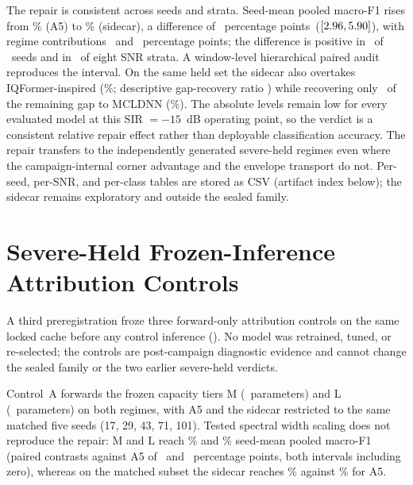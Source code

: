 \documentclass[letterpaper,onecolumn,11pt,journal]{IEEEtran}
\newcommand{\pp}{percentage points}
\begin{document}
The repair is consistent across seeds and strata. Seed-mean pooled macro-F1
rises from \SevereRepairLevelAFive\%
(A5) to \SevereRepairLevelSidecar\% (sidecar), a difference of
\SevereRepairDiff\ \pp\ ($[2.96,5.90]$), with
regime contributions \SevereRepairRegimeOneDiff\ and
\SevereRepairRegimeTwoDiff\ \pp; the difference is positive in
\SevereRepairPositiveSeeds\ of \ProtocolSeedCount\ seeds and in
\SevereRepairPositiveSnrStrata\ of eight SNR strata. A window-level
hierarchical paired audit reproduces the interval. On the same held set the
sidecar also overtakes IQFormer-inspired (\SevereRepairLevelIqformer\%;
descriptive gap-recovery ratio \SevereRepairGapRecoveryIqformer) while
recovering only \SevereRepairGapRecoveryMcldnn\ of the remaining gap to
MCLDNN (\SevereRepairLevelMcldnn\%). The absolute levels remain low for every
evaluated model at this SIR $=-15$~dB operating point, so the verdict is a
consistent relative repair effect rather than deployable classification
accuracy. The repair transfers to the independently generated severe-held
regimes even where the campaign-internal corner advantage and the envelope
transport do not. Per-seed, per-SNR, and per-class tables are stored as CSV
(artifact index below); the sidecar remains exploratory and outside the
sealed family.

\section{Severe-Held Frozen-Inference Attribution Controls}
\label{sec:controls}
A third preregistration froze three forward-only attribution controls on the
same locked cache before any control inference
(). No model was
retrained, tuned, or re-selected; the controls are post-campaign diagnostic
evidence and cannot change the sealed family or the two earlier severe-held
verdicts.

Control~A forwards the frozen capacity tiers M (\CapacityMParameters\
parameters) and L (\CapacityLParameters\ parameters) on both regimes, with
A5 and the sidecar restricted to the same matched five seeds
(17, 29, 43, 71, 101). Tested spectral width scaling does not reproduce the
repair: M and L reach \SevereControlLevelCapM\% and \SevereControlLevelCapL\%
seed-mean pooled macro-F1 (paired contrasts against A5 of
\SevereControlDiffCapM\ and \SevereControlDiffCapL\ \pp, both intervals
including zero), whereas on the matched subset the sidecar reaches
\SevereControlMatchedLevelSidecar\% against
\SevereControlMatchedLevelAFive\% for A5.
\end{document}
